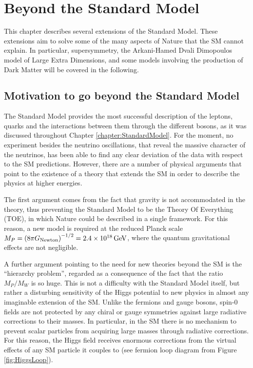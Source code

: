 \chapter{Beyond the Standard Model}
\label{chapter:BSM}

This chapter describes several extensions of the Standard Model.
These extensions aim to solve some of the many aspects of Nature that the SM cannot explain.
In particular, supersymmetry, the Arkani-Hamed Dvali Dimopoulos model of Large Extra Dimensions, and some models involving the production of Dark Matter will be covered in the following.


\section{Motivation to go beyond the Standard Model}
\label{sec:MotivationBSM}

The Standard Model provides the most successful description of the leptons, quarks and the interactions between them through the different bosons, as it was discussed throughout Chapter \ref{chapter:StandardModel}.
For the moment, no experiment besides the neutrino oscillations, that reveal the massive character of the neutrinos, has been able to find any clear deviation of the data with respect to the SM predictions.
However, there are a number of physical arguments that point to the existence of a theory that extends the SM in order to describe the physics at higher energies.

The first argument comes from the fact that gravity is not accommodated in the theory, thus preventing the Standard Model to be the Theory Of Everything (TOE), in which Nature could be described in a single framework.
For this reason, a new model is required at the reduced Planck scale $M_P = \left(8\pi G_\text{Newton}\right)^{-1/2} = \unit[2.4\times 10^{18}]{GeV}$, where the quantum gravitational effects are not negligible.

A further argument pointing to the need for new theories beyond the SM is the ``hierarchy problem'', regarded as a consequence of the fact that the ratio $M_P/M_W$ is so huge.
This is not a difficulty with the Standard Model itself, but rather a disturbing sensitivity of the Higgs potential to new physics in almost any imaginable extension of the SM.
Unlike the fermions and gauge bosons, spin-0 fields are not protected by any chiral or gauge symmetries against large radiative corrections to their masses.
In particular, in the SM there is no mechanism to prevent scalar particles from acquiring large masses through radiative corrections.
For this reason, the Higgs field receives enormous corrections from the virtual effects of any SM particle it couples to (see fermion loop diagram from Figure \ref{fig:HiggsLoop}).

